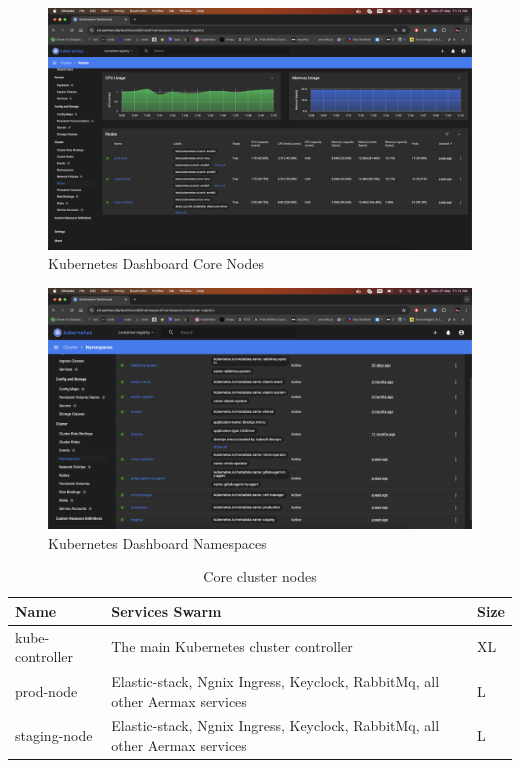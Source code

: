 \begin{figure}[H]
  \centering
  \includegraphics[width=1\textwidth]{src/assets/chapters/kubernodes.png}
  \caption{Kubernetes Dashboard Core Nodes}
  \label{fig:kubernodes}
\end{figure}

\begin{figure}[H]
  \centering
  \includegraphics[width=1\textwidth]{src/assets/chapters/kubernamespaces.png}
  \caption{Kubernetes Dashboard Namespaces}
  \label{fig:kubernamespaces}
\end{figure}

\begin{table}[h!]
  \centering
  \renewcommand{\arraystretch}{1.5} 
  \caption{ Core cluster nodes}
  \label{tab: core_cluster_nodes}
  \begin{tabularx}{\textwidth}{|>{\centering\arraybackslash}X|>{\centering\arraybackslash}X|>{\centering\arraybackslash}X|}
      \hline
      \rowcolor{blue!20} 
      \textbf{Name} & \textbf{Services Swarm} & \textbf{Size} \\
      \hline
      kube-controller & The main Kubernetes cluster controller  & XL \\
      \hline
      prod-node & Elastic-stack, Ngnix Ingress, Keyclock, RabbitMq, all other Aermax services  & L \\
      \hline
      staging-node & Elastic-stack, Ngnix Ingress, Keyclock, RabbitMq, all other Aermax services  & L \\
      \hline
  \end{tabularx}
\end{table}


